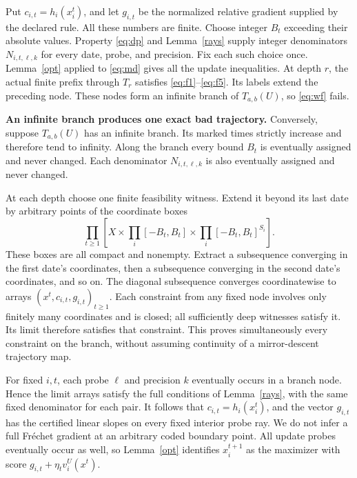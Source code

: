 \documentclass[11pt,a4paper]{article}
\begin{document}
Put \(c_{i,t}=h_i(x_i^t)\), and let \(g_{i,t}\) be the normalized relative
gradient supplied by the declared rule. All these numbers are finite.
Choose integer \(B_t\) exceeding their absolute values. Property \eqref{eq:dp} and
Lemma~\ref{rays} supply integer denominators \(N_{i,t,\ell,k}\) for every date,
probe, and precision.
Fix each such choice once. Lemma~\ref{opt} applied to \eqref{eq:md} gives all the
update inequalities. At depth \(r\), the actual finite prefix through \(T_r\)
satisfies \eqref{eq:f1}--\eqref{eq:f5}. Its labels extend the preceding node. These nodes form
an infinite branch of \(T_{a,b}(U)\), so \eqref{eq:wf} fails.

\textbf{An infinite branch produces one exact bad trajectory.}
Conversely, suppose \(T_{a,b}(U)\) has an infinite branch. Its marked times
strictly increase and therefore tend to infinity. Along the branch every
bound \(B_t\) is eventually assigned and never changed. Each denominator
\(N_{i,t,\ell,k}\) is also eventually assigned and never changed.

At each depth choose one finite feasibility witness. Extend it beyond its last
date by arbitrary points of the coordinate boxes
\begin{equation}
\prod_{t\ge1}\left[X\times
\prod_i[-B_t,B_t]\times\prod_i[-B_t,B_t]^{S_i}\right].
\label{eq:box}
\end{equation}
These boxes are all compact and nonempty. Extract a subsequence converging in
the first date's coordinates, then a subsequence converging in the second date's
coordinates, and so on. The diagonal subsequence converges coordinatewise to
arrays \((x^t,c_{i,t},g_{i,t})_{t\ge1}\). Each constraint from any fixed node
involves only finitely many coordinates and is closed; all sufficiently deep
witnesses satisfy it. Its limit therefore satisfies that constraint. This proves
simultaneously every constraint on the branch, without assuming continuity
of a mirror-descent trajectory map.

For fixed \(i,t\), each probe \(\ell\) and precision \(k\) eventually occurs
in a branch node. Hence the limit arrays satisfy the full conditions of
Lemma~\ref{rays}, with the same fixed denominator for each pair. It follows
that \(c_{i,t}=h_i(x_i^t)\), and the vector \(g_{i,t}\) has the certified
linear slopes on every fixed interior probe ray. We do not infer a full
Fr\'echet gradient at an arbitrary coded boundary point.
All update probes eventually occur as well, so Lemma~\ref{opt} identifies
\(x_i^{t+1}\) as the maximizer with score \(g_{i,t}+\eta_t v_i^U(x^t)\).
\end{document}
